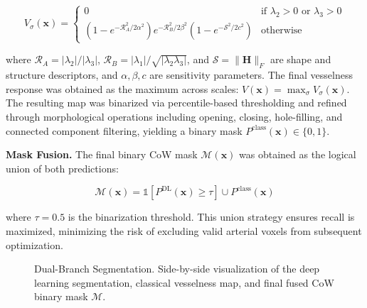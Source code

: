 \documentclass[11pt]{article}
\begin{document}
\begin{equation}
    V_\sigma(\mathbf{x}) = \begin{cases}
        0 & \text{if } \lambda_2 > 0 \text{ or } \lambda_3 > 0 \\[6pt]
        \left(1 - e^{-\mathcal{R}_A^2 / 2\alpha^2}\right)
        e^{-\mathcal{R}_B^2 / 2\beta^2}
        \left(1 - e^{-\mathcal{S}^2 / 2c^2}\right) & \text{otherwise}
    \end{cases}
\end{equation}

where $\mathcal{R}_A = |\lambda_2|/|\lambda_3|$, $\mathcal{R}_B = |\lambda_1|/\sqrt{|\lambda_2 \lambda_3|}$, and $\mathcal{S} = \|\mathbf{H}\|_F$ are shape and structure descriptors, and $\alpha, \beta, c$ are sensitivity parameters. The final vesselness response was obtained as the maximum across scales: $V(\mathbf{x}) = \max_\sigma V_\sigma(\mathbf{x})$. The resulting map was binarized via percentile-based thresholding and refined through morphological operations including opening, closing, hole-filling, and connected component filtering, yielding a binary mask $P^{\text{class}}(\mathbf{x}) \in \{0, 1\}$.

\textbf{Mask Fusion.} The final binary CoW mask $\mathcal{M}(\mathbf{x})$ was obtained as the logical union of both predictions:

\begin{equation}
    \mathcal{M}(\mathbf{x}) = \mathbb{1}\left[P^{\text{DL}}(\mathbf{x}) \geq \tau\right] \cup P^{\text{class}}(\mathbf{x})
\end{equation}

where $\tau = 0.5$ is the binarization threshold. This union strategy ensures recall is maximized, minimizing the risk of excluding valid arterial voxels from subsequent optimization.

\begin{figure}[!htbp]
    \centering
    \caption{Dual-Branch Segmentation. Side-by-side visualization of the deep learning segmentation, classical vesselness map, and final fused CoW binary mask $\mathcal{M}$.}
    \label{fig:segmentation}
\end{figure}
\end{document}
